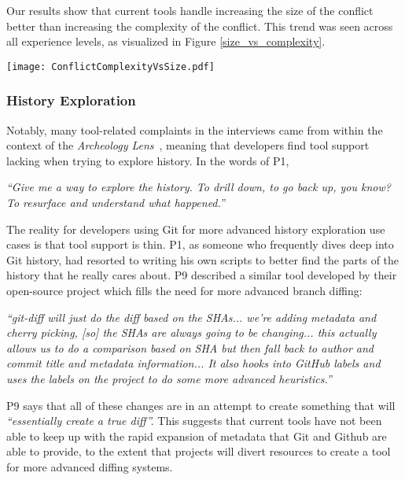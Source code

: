 Our results show that current tools handle increasing the size of the conflict better than increasing the complexity of the conflict. This trend was seen across all experience levels, as visualized in Figure \ref{size_vs_complexity}.

\begin{figure*}[!t]
\centering
\texttt{[image: ConflictComplexityVsSize.pdf]}
\caption{Effectiveness of developer tools in supporting varying levels of size and complexity (by developer experience). Values are number of responses per answer.}
\label{size_vs_complexity}
\end{figure*}

\subsubsection{History Exploration}

Notably, many tool-related complaints in the interviews came from within the context of the \textit{Archeology Lens}~\cite{mihai_lenses}, meaning that developers find tool support lacking when trying to explore history. In the words of P1, 

\begin{displayquote}
\textit{``Give me a way to explore the history. To drill down, to go back up, you know? To resurface and understand what happened.''}
\end{displayquote}

The reality for developers using Git for more advanced history exploration use cases is that tool support is thin. P1, as someone who frequently dives deep into Git history, had resorted to writing his own scripts to better find the parts of the history that he really cares about. P9 described a similar tool developed by their open-source project which fills the need for more advanced branch diffing:
\begin{displayquote}
\textit{``git-diff will just do the diff based on the SHAs... we're adding metadata and cherry picking, [so] the SHAs are always going to be changing... this actually allows us to do a comparison based on SHA but then fall back to author and commit title and metadata information... It also hooks into GitHub labels and uses the labels on the project to do some more advanced heuristics.''}
\end{displayquote}

P9 says that all of these changes are in an attempt to create something that will \textit{``essentially create a true diff''.}
This suggests that current tools have not been able to keep up with the rapid expansion of metadata that Git and Github are able to provide, to the extent that projects will divert resources to create a tool for more advanced diffing systems. 

